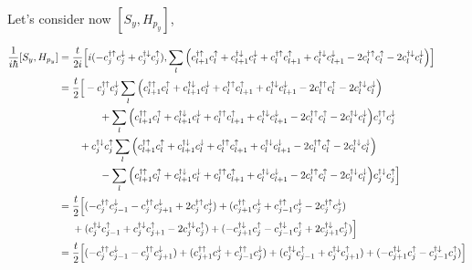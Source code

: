 \documentclass[10pt,prb,showpacs,amssymb,floatfix]{revtex4-1}
\newcommand{\dg}{\dagger}
\newcommand{\dna}{\downarrow}
\newcommand{\dn}{\downarrow}
\newcommand{\nn}{\nonumber}
\newcommand{\upa}{\uparrow}
\begin{document}
Let's consider now $[S_y, H_{p_y}]$,

\begin{align}
\frac{1}{i\hbar}[S_y,H_{p_y}] &= \frac{t}{2i}\Big{[} i( - c_{j}^{\dg\upa} c_{j}^{\dna} + c_{j}^{\dg\dna} c_{j}^{\upa}) ,   \sum_{l}  \Big{(} c_{l+1}^{\dagger \upa} c_{l}^\upa + c_{l+1}^{\dagger \dn} c_{l}^\dn  +c_{l}^{\dagger \upa} c_{l+1}^\upa + c_{l}^{\dagger \dn} c_{l+1}^\dn  - 2 c_{l}^{\dagger \upa} c_{l}^\upa   - 2 c_{l}^{\dagger \dn} c_{l}^\dn  \Big{)} \Big{]} \\
&=  \frac{t}{2} \Big{[}- c_{j}^{\dg\upa} c_{j}^{\dna}  \sum_{l}  \Big{(} c_{l+1}^{\dagger \upa} c_{l}^\upa + c_{l+1}^{\dagger \dn} c_{l}^\dn  +c_{l}^{\dagger \upa} c_{l+1}^\upa + c_{l}^{\dagger \dn} c_{l+1}^\dn  - 2 c_{l}^{\dagger \upa} c_{l}^\upa   - 2 c_{l}^{\dagger \dn} c_{l}^\dn  \Big{)} \nn\\
&~~~~~~~~~~~~ +  \sum_{l}  \Big{(} c_{l+1}^{\dagger \upa} c_{l}^\upa + c_{l+1}^{\dagger \dn} c_{l}^\dn  +c_{l}^{\dagger \upa} c_{l+1}^\upa + c_{l}^{\dagger \dn} c_{l+1}^\dn  - 2 c_{l}^{\dagger \upa} c_{l}^\upa   - 2 c_{l}^{\dagger \dn} c_{l}^\dn  \Big{)} c_{j}^{\dg\upa} c_{j}^{\dna} \nn\\
 &~~~~~~ + c_{j}^{\dg\dna} c_{j}^{\upa}  \sum_{l}  \Big{(} c_{l+1}^{\dagger \upa} c_{l}^\upa + c_{l+1}^{\dagger \dn} c_{l}^\dn  +c_{l}^{\dagger \upa} c_{l+1}^\upa + c_{l}^{\dagger \dn} c_{l+1}^\dn  - 2 c_{l}^{\dagger \upa} c_{l}^\upa   - 2 c_{l}^{\dagger \dn} c_{l}^\dn  \Big{)} \nn\\
 &~~~~~~~~~~~~ -  \sum_{l}  \Big{(} c_{l+1}^{\dagger \upa} c_{l}^\upa + c_{l+1}^{\dagger \dn} c_{l}^\dn  +c_{l}^{\dagger \upa} c_{l+1}^\upa + c_{l}^{\dagger \dn} c_{l+1}^\dn  - 2 c_{l}^{\dagger \upa} c_{l}^\upa   - 2 c_{l}^{\dagger \dn} c_{l}^\dn  \Big{)}  c_{j}^{\dg\dna} c_{j}^{\upa} \Big{]} \nn\\
 &= \frac{t}{2} \Big{[}(- c_{j}^{\dg\upa} c_{j-1}^{\dna} - c_{j}^{\dg\upa} c_{j+1}^{\dna} + 2 c_{j}^{\dg\upa} c_{j}^{\dna}) + ( c_{j+1}^{\dg\upa} c_{j}^{\dna} + c_{j-1}^{\dg\upa} c_{j}^{\dna} -  2 c_{j}^{\dg\upa} c_{j}^{\dna} )  \nn\\ 
 &~~~~+ ( c_{j}^{\dg\dna} c_{j-1}^{\upa} + c_{j}^{\dg\dna} c_{j+1}^{\upa} -  2 c_{j}^{\dg\dna} c_{j}^{\upa} ) + ( - c_{j+1}^{\dg\dna} c_{j}^{\upa}  - c_{j-1}^{\dg\dna} c_{j}^{\upa} + 2 c_{j+1}^{\dg\dna} c_{j}^{\upa}   )   \Big{]} \nn\\
 &= \frac{t}{2} \Big{[}(- c_{j}^{\dg\upa} c_{j-1}^{\dna} - c_{j}^{\dg\upa} c_{j+1}^{\dna}) + ( c_{j+1}^{\dg\upa} c_{j}^{\dna} + c_{j-1}^{\dg\upa} c_{j}^{\dna}) + ( c_{j}^{\dg\dna} c_{j-1}^{\upa} + c_{j}^{\dg\dna} c_{j+1}^{\upa} ) + ( - c_{j+1}^{\dg\dna} c_{j}^{\upa}  - c_{j-1}^{\dg\dna} c_{j}^{\upa}   )   \Big{]} \nn\\

\end{align}
\end{document}
